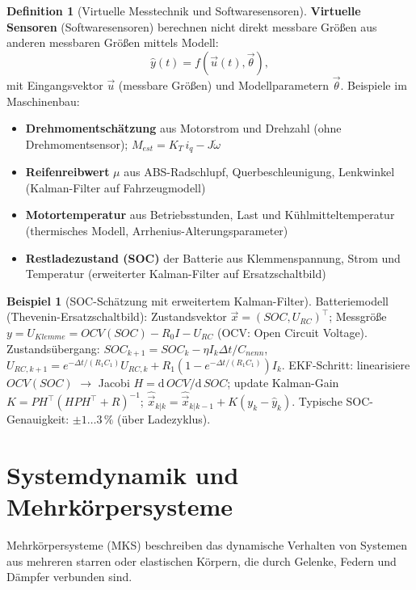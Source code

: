 ﻿\documentclass[a4paper,12pt]{report}
\theoremstyle{definition}
\newtheorem{definition}{Definition}
\newtheorem{beispiel}{Beispiel}
\begin{document}
\begin{definition}[Virtuelle Messtechnik und Softwaresensoren]
\textbf{Virtuelle Sensoren} (Softwaresensoren) berechnen nicht direkt messbare
Größen aus anderen messbaren Größen mittels Modell:
\[
  \hat{y}(t) = f(\vec{u}(t), \vec{\theta}),
\]
mit Eingangsvektor $\vec{u}$ (messbare Größen) und Modellparametern $\vec{\theta}$.
Beispiele im Maschinenbau:
\begin{itemize}
    \item[-] \textbf{Drehmomentschätzung} aus Motorstrom und Drehzahl
          (ohne Drehmomentsensor); $M_{est} = K_T\,i_q - J\dot{\omega}$
    \item[-] \textbf{Reifenreibwert} $\mu$ aus ABS-Radschlupf, Querbeschleunigung,
          Lenkwinkel (Kalman-Filter auf Fahrzeugmodell)
    \item[-] \textbf{Motortemperatur} aus Betriebsstunden, Last und Kühlmitteltemperatur
          (thermisches Modell, Arrhenius-Alterungsparameter)
    \item[-] \textbf{Restladezustand (SOC)} der Batterie aus Klemmenspannung,
          Strom und Temperatur (erweiterter Kalman-Filter auf Ersatzschaltbild)
\end{itemize}
\end{definition}

\begin{beispiel}[SOC-Schätzung mit erweitertem Kalman-Filter]
Batteriemodell (Thevenin-Ersatzschaltbild):
Zustandsvektor $\vec{x} = (SOC, U_{RC})^\top$;
Messgröße $y = U_{Klemme} = OCV(SOC) - R_0 I - U_{RC}$ (OCV: Open Circuit Voltage).
Zustandsübergang: $SOC_{k+1} = SOC_k - \eta I_k \Delta t / C_{nenn}$,
$U_{RC,k+1} = e^{-\Delta t/(R_1 C_1)} U_{RC,k} + R_1(1-e^{-\Delta t/(R_1 C_1)})I_k$.
EKF-Schritt: linearisiere $OCV(SOC)$ $\to$ Jacobi $H = \mathrm{d}\,OCV/\mathrm{d}\,SOC$;
update Kalman-Gain $K = PH^\top(HPH^\top + R)^{-1}$;
$\hat{\vec{x}}_{k|k} = \hat{\vec{x}}_{k|k-1} + K(y_k - \hat{y}_k)$.
Typische SOC-Genauigkeit: $\pm 1\ldots3\,\%$ (über Ladezyklus).
\end{beispiel}

\chapter{Systemdynamik und Mehrkörpersysteme}

Mehrkörpersysteme (MKS) beschreiben das dynamische Verhalten von
Systemen aus mehreren starren oder elastischen Körpern, die durch
Gelenke, Federn und Dämpfer verbunden sind.
\end{document}
